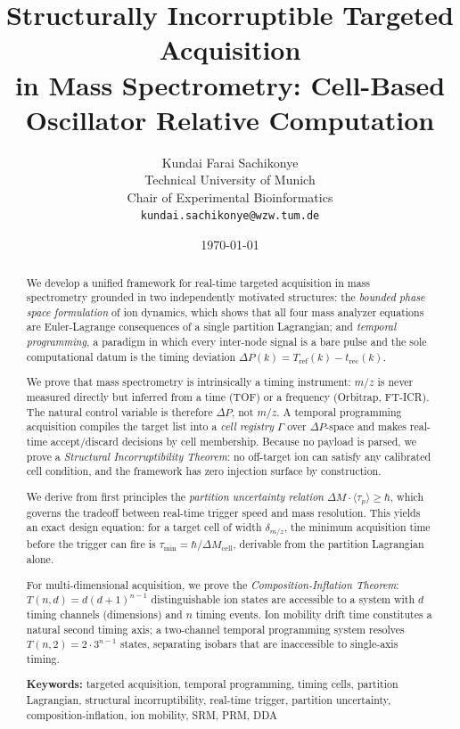 \documentclass[twocolumn,10pt,a4paper]{article}
\title{\textbf{Structurally Incorruptible Targeted Acquisition\\
in Mass Spectrometry: Cell-Based Oscillator Relative Computation}}
\author{
Kundai Farai Sachikonye\\
Technical University of Munich\\
Chair of Experimental Bioinformatics\\
\texttt{kundai.sachikonye@wzw.tum.de}
}
\date{\today}
\theoremstyle{thmstyle}
\theoremstyle{definition}
\theoremstyle{remark}
\newcommand{\DP}{\Delta P}
\newcommand{\Tref}{T_{\mathrm{ref}}}
\newcommand{\trec}{t_{\mathrm{rec}}}
\newcommand{\tp}{\langle\tau_{p}\rangle}
\begin{document}
\maketitle

\begin{abstract}
\noindent
We develop a unified framework for real-time targeted acquisition in
mass spectrometry grounded in two independently motivated structures:
the \emph{bounded phase space formulation} of ion dynamics, which shows
that all four mass analyzer equations are Euler-Lagrange consequences
of a single partition Lagrangian; and \emph{temporal programming}, a
paradigm in which every inter-node signal is a bare pulse and the sole
computational datum is the timing deviation
$\DP(k) = \Tref(k) - \trec(k)$.

We prove that mass spectrometry is intrinsically a timing instrument:
$m/z$ is never measured directly but inferred from a time (TOF) or a
frequency (Orbitrap, FT-ICR). The natural control variable is therefore
$\DP$, not $m/z$. A temporal programming acquisition compiles the target
list into a \emph{cell registry} $\Gamma$ over $\DP$-space and makes
real-time accept/discard decisions by cell membership. Because no payload
is parsed, we prove a \emph{Structural Incorruptibility Theorem}: no
off-target ion can satisfy any calibrated cell condition, and the
framework has zero injection surface by construction.

We derive from first principles the \emph{partition uncertainty relation}
$\Delta M \cdot \tp \geq \hbar$, which governs the tradeoff between
real-time trigger speed and mass resolution. This yields an exact design
equation: for a target cell of width $\delta_{m/z}$, the minimum
acquisition time before the trigger can fire is
$\tau_{\min} = \hbar/\Delta M_{\mathrm{cell}}$, derivable from the
partition Lagrangian alone.

For multi-dimensional acquisition, we prove the
\emph{Composition-Inflation Theorem}:
$T(n,d) = d(d+1)^{n-1}$ distinguishable ion states are accessible to a
system with $d$ timing channels (dimensions) and $n$ timing events. Ion
mobility drift time constitutes a natural second timing axis; a two-channel
temporal programming system resolves $T(n,2) = 2 \cdot 3^{n-1}$ states,
separating isobars that are inaccessible to single-axis timing.

\medskip\noindent\textbf{Keywords:} targeted acquisition, temporal
programming, timing cells, partition Lagrangian, structural incorruptibility,
real-time trigger, partition uncertainty, composition-inflation, ion mobility,
SRM, PRM, DDA
\end{abstract}
\end{document}
